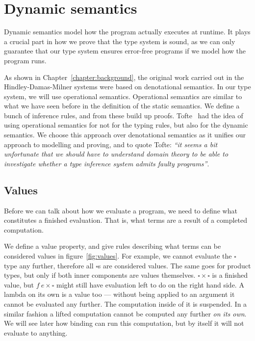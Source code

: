 
\section{Dynamic semantics}
Dynamic semantics model how the program actually executes at
runtime. It plays a crucial part in how we prove that the type system
is sound, as we can only guarantee that our type system ensures
error-free programs if we model how the program runs.

As shown in Chapter~\ref{chapter:background}, the original work
carried out in the Hindley-Damas-Milner systems were based on
denotational semantics. In our type system, we will use operational
semantics. Operational semantics are similar to what we have seen
before in the definition of the static semantics. We define a bunch of
inference rules, and from these build up proofs. Tofte~\cite{tofte1988}
had the idea of using operational semantics for not for the
typing rules, but also for the dynamic semantics. We choose this
approach over denotational semantics as it unifies our approach to
modelling and proving, and to quote Tofte: \textit{``it seems a bit
unfortunate that we should have to understand domain theory to be able
to investigate whether a type inference system admits faulty
programs''}.

\subsection{Values}
Before we can talk about how we evaluate a program, we need to
define what constitutes a finished evaluation. That is, what
terms are a result of a completed computation.

We define a value property, and give rules describing what terms can
be considered values in figure~\ref{fig:values}. For example, we
cannot evaluate the $\square$ type any further, therefore all $\square$s
are considered values. The same goes for product types, but only if
both inner components are values themselves. $\square \times \square$ is a
finished value, but $f \ e \times \square$ might still have evaluation left to
do on the right hand side.
A lambda on its own is a value too ---
without being applied to an argument it cannot be evaluated any
further. The computation inside of it is suspended.
In a similar fashion a lifted computation cannot be computed any
further \textit{on its own}. We will see later how binding can run
this computation, but by itself it will not evaluate to anything.

